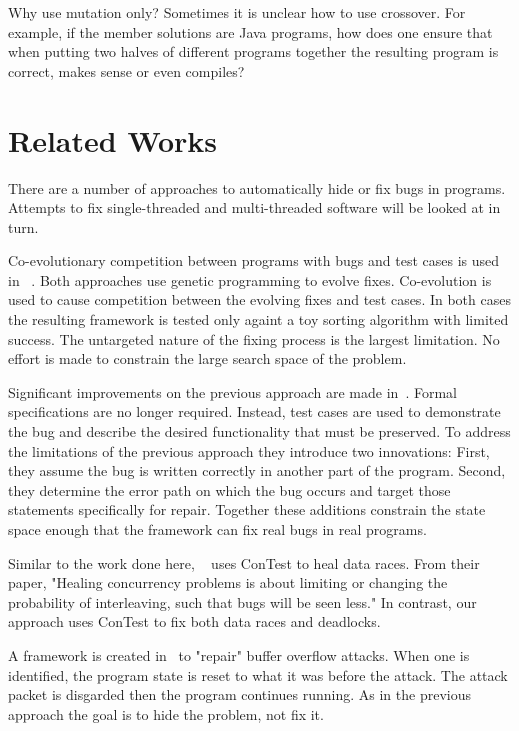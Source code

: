 \documentclass[10pt, conference, compsocconf]{IEEEtran}
\begin{document}
Why use mutation only?  Sometimes it is unclear how to use crossover.  For example,
if the member solutions are Java programs, how does one ensure that when putting two
halves of different programs together the resulting program is correct, makes sense
or even compiles?

\section{Related Works}

There are a number of approaches to automatically hide or fix bugs in programs.
Attempts to fix single-threaded and multi-threaded software will be looked at
in turn.

Co-evolutionary competition between programs with bugs and test cases is used in
~\cite{AY08, Arc08, WT10}. Both approaches use genetic programming to evolve
fixes. Co-evolution is used to cause competition between the evolving fixes and
test cases. In both cases the resulting framework is tested only againt a toy
sorting algorithm with limited success. The untargeted nature of the fixing
process is the largest limitation. No effort is made to constrain the large
search space of the problem.

Significant improvements on the previous approach are made in~\cite{FNWG09, WNLF09,
WLF09, WFGN10, GNFW11}. Formal specifications are no longer required. Instead,
test cases are used to demonstrate the bug and describe the desired functionality
that must be preserved. To address the limitations of the previous approach they
introduce two innovations: First, they assume the bug is written correctly in 
another part of the program. Second, they determine the error path on which the
bug occurs and target those statements specifically for repair.  Together these
additions constrain the state space enough that the framework can fix real bugs in
real programs.

Similar to the work done here, ~\cite{KLT+07, LVK08} uses ConTest to heal data 
races. From their paper, "Healing concurrency problems is about limiting or 
changing the probability of interleaving, such that bugs will be seen less." In
contrast, our approach uses ConTest to fix both data races and deadlocks.

A framework is created in~\cite{CB05} to "repair" buffer overflow attacks.  When
one is identified, the program state is reset to what it was before the attack.
The attack packet is disgarded then the program continues running. As in the
previous approach the goal is to hide the problem, not fix it.
\end{document}
